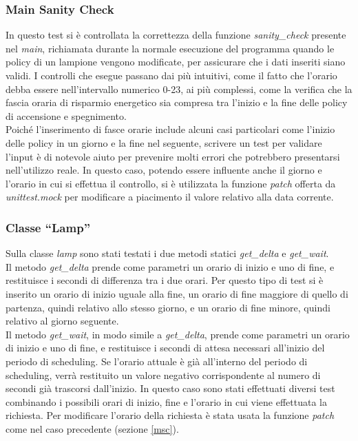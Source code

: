 \subsubsection{Main Sanity Check \label{msc}}
In questo test si è controllata la correttezza della funzione \textit{sanity\_check} presente nel \textit{main}, richiamata durante la normale esecuzione del programma quando le policy di un lampione vengono modificate, per assicurare che i dati inseriti siano validi.
I controlli che esegue passano dai più intuitivi, come il fatto che l'orario debba essere nell'intervallo numerico 0-23, ai più complessi, come la verifica che la fascia oraria di risparmio energetico sia compresa tra l'inizio e la fine delle policy di accensione e spegnimento.
\\Poiché l'inserimento di fasce orarie include alcuni casi particolari come l'inizio delle policy in un giorno e la fine nel seguente, scrivere un test per validare l'input è di notevole aiuto per prevenire molti errori che potrebbero presentarsi nell'utilizzo reale.
In questo caso, potendo essere influente anche il giorno e l'orario in cui si effettua il controllo, si è utilizzata la funzione \textit{patch} offerta da \textit{unittest.mock} per modificare a piacimento il valore relativo alla data corrente.

\subsubsection{Classe ``Lamp''}
Sulla classe \textit{lamp} sono stati testati i due metodi statici \textit{get\_delta} e \textit{get\_wait}.
\\Il metodo \textit{get\_delta} prende come parametri un orario di inizio e uno di fine, e restituisce i secondi di differenza tra i due orari.
Per questo tipo di test si è inserito un orario di inizio uguale alla fine, un orario di fine maggiore di quello di partenza, quindi relativo allo stesso giorno, e un orario di fine minore, quindi relativo al giorno seguente.
\\Il metodo \textit{get\_wait}, in modo simile a \textit{get\_delta}, prende come parametri un orario di inizio e uno di fine, e restituisce i secondi di attesa necessari all'inizio del periodo di scheduling.
Se l'orario attuale è già all'interno del periodo di scheduling, verrà restituito un valore negativo corrispondente al numero di secondi già trascorsi dall'inizio.
In questo caso sono stati effettuati diversi test combinando i possibili orari di inizio, fine e l'orario in cui viene effettuata la richiesta.
Per modificare l'orario della richiesta è stata usata la funzione \textit{patch} come nel caso precedente (sezione \ref{msc}).

